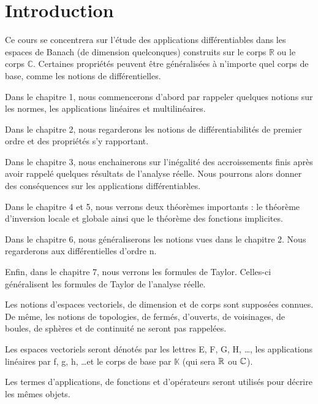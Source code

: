 \chapter*{Introduction}

Ce cours se concentrera sur l'étude des applications différentiables dans les
espaces de Banach (de dimension quelconques) construits sur le corps
$\mathbb{R}$ ou le corps $\mathbb{C}$.  Certaines propriétés peuvent être
généralisées à n'importe quel corps de base, comme les notions de
différentielles.

Dans le chapitre 1, nous commencerons d'abord par rappeler quelques notions sur
les normes, les applications linéaires et multilinéaires.

Dans le chapitre 2, nous regarderons les notions de différentiabilités de
premier ordre et des propriétés s'y rapportant.

Dans le chapitre 3, nous enchainerons sur l'inégalité des accroissements finis après
avoir rappelé quelques résultats de l'analyse réelle. Nous pourrons alors donner
des conséquences sur les applications différentiables.

Dans le chapitre 4 et 5, nous verrons deux théorèmes importants : le théorème
d'inversion locale et globale ainsi que le théorème des fonctions implicites.

Dans le chapitre 6, nous généraliserons les notions vues dans le chapitre 2.
Nous regarderons aux différentielles d'ordre n.

Enfin, dans le chapitre 7, nous verrons les formules de Taylor. Celles-ci
généralisent les formules de Taylor de l'analyse réelle.

Les notions d'espaces vectoriels, de dimension et de corps sont supposées
connues. De même, les notions de topologies, de fermés, d'ouverts, de
voisinages, de boules, de sphères et de continuité ne seront pas rappelées.

Les espaces vectoriels seront dénotés par les lettres E, F, G, H, \ldots, les
applications linéaires par f, g, h, \ldots et le corps de base par $\mathbb{K}$
(qui sera $\mathbb{R}$ ou $\mathbb{C}$).

Les termes d'applications, de fonctions et d'opérateurs seront utilis\'es pour
d\'ecrire les mêmes objets.
